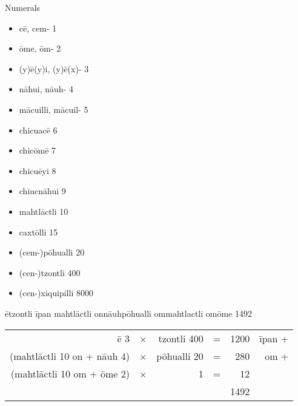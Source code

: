 \documentclass[12pt]{beamer}
\newcommand{\nah}[1]{\textcolor{nahgrn}{#1}}
\newcommand{\trs}[1]{\textcolor{nahblu}{#1}}
\begin{document}
\begin{frame}
\begin{columns}[t]
\begin{column}{.26\linewidth}
      \begin{block}{Numerals}
        \vspace{-1.5ex}
        \begin{multicols}{2}
          \begin{itemize}
            \item \nah{cē}, \nah{cem-} \trs{1}
            \item \nah{ōme}, \nah{ōm-} \trs{2}
            \item \nah{(y)ē(y)i}, \nah{(y)ē(x)-} \trs{3}
            \item \nah{nāhui}, \nah{nāuh-} \trs{4}
            \item \nah{mācuilli}, \nah{mācuil-} \trs{5}
            \item \nah{chicuacē} \trs{6}
            \item \nah{chicōmē} \trs{7}
            \item \nah{chicuēyi} \trs{8}
            \item \nah{chiucnāhui} \trs{9}
            \item \nah{mahtlāctli} \trs{10}
            \item \nah{caxtōlli} \trs{15}
            \item \nah{(cem-)pōhualli} \trs{20}
            \item \nah{(cen-)tzontli} \trs{400}
            \item \nah{(cen-)xiquipilli} \trs{8000}
          \end{itemize}
        \end{multicols}
      \end{block}
      \begin{example}
        \nah{ētzontli īpan mahtlāctli onnāuhpōhualli ommahtlactli omōme} \trs{1492}
        \begin{center}
          \begin{tabular}{r@{~}c@{~}r@{~}c@{~}r@{~}r}
            \nah{ē} \trs{3}                                     & × & \nah{tzontli} \trs{400} & = & 1200 & \nah{īpan} \trs{+} \\
            (\nah{mahtlāctli} \trs{10} \nah{on} \trs{+} \nah{nāuh} \trs{4}) & × & \nah{pōhualli} \trs{20} & = & 280  & \nah{om} \trs{+}   \\
            (\nah{mahtlāctli} \trs{10} \nah{om} \trs{+} \nah{ōme} \trs{2})  & × & 1                 & = & 12   &              \\\hline
                                                          &   &                   &   & 1492 &              \\
          \end{tabular}
        \end{center}
      \end{example}
    \end{column}


\end{columns}
\end{frame}
\end{document}
